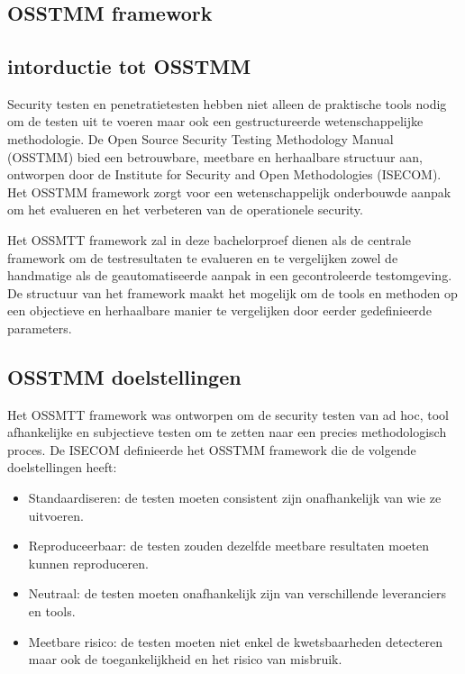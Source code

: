 
\chapter{}%
\label{ch:Proof of Concept}


\section{OSSTMM framework}

\section{intorductie tot OSSTMM}
Security testen en penetratietesten hebben niet alleen de praktische tools nodig om de testen uit te voeren maar ook een gestructureerde wetenschappelijke methodologie.
De Open Source Security Testing Methodology Manual (OSSTMM) bied een betrouwbare, meetbare en herhaalbare structuur aan, ontworpen door de Institute for Security and Open Methodologies (ISECOM).
Het OSSTMM framework zorgt voor een wetenschappelijk onderbouwde aanpak om het evalueren en het verbeteren van de operationele security.

Het OSSMTT framework zal in deze bachelorproef dienen als de centrale framework om de testresultaten te evalueren en te vergelijken zowel de handmatige als de geautomatiseerde aanpak in een gecontroleerde testomgeving.
De structuur van het framework maakt het mogelijk om de tools en methoden op een objectieve en herhaalbare manier te vergelijken door eerder gedefinieerde parameters.

\section{OSSTMM doelstellingen}
Het OSSMTT framework was ontworpen om de security testen van ad hoc, tool afhankelijke en subjectieve testen om te zetten naar een precies methodologisch proces.
De ISECOM definieerde het OSSTMM framework die de volgende doelstellingen heeft:

\begin{itemize}
  \item Standaardiseren: de testen moeten consistent zijn onafhankelijk van wie ze uitvoeren.
  \item Reproduceerbaar: de testen zouden dezelfde meetbare resultaten moeten kunnen reproduceren.
  \item Neutraal: de testen moeten onafhankelijk zijn van verschillende leveranciers en tools.
  \item Meetbare risico: de testen moeten niet enkel de kwetsbaarheden detecteren maar ook de toegankelijkheid en het risico van misbruik.
\end{itemize}

